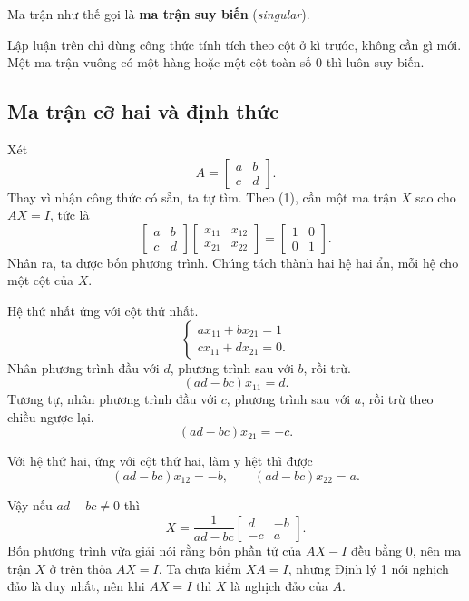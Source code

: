 \documentclass[12pt,a4paper]{article}
\begin{document}
Ma trận như thế gọi là \textbf{ma trận suy biến} (\emph{singular}).

Lập luận trên chỉ dùng công thức tính tích theo cột ở kì trước, không cần gì mới. Một ma trận vuông có một hàng hoặc một cột toàn số \(0\) thì luôn suy biến.

\subsection{Ma trận cỡ hai và định thức}

Xét
$$
A=\left[ \begin{array}{cc} a & b\\ c & d \end{array} \right].
$$
Thay vì nhận công thức có sẵn, ta tự tìm. Theo (1), cần một ma trận \(X\) sao cho \(AX=I\), tức là
$$
\left[ \begin{array}{cc} a & b\\ c & d \end{array} \right]\left[ \begin{array}{cc} x_{11} & x_{12}\\ x_{21} & x_{22} \end{array} \right]=\left[ \begin{array}{cc} 1 & 0\\ 0 & 1 \end{array} \right].
$$
Nhân ra, ta được bốn phương trình. Chúng tách thành hai hệ hai ẩn, mỗi hệ cho một cột của \(X\).

Hệ thứ nhất ứng với cột thứ nhất.
$$
\begin{cases} ax_{11}+bx_{21}=1\\ cx_{11}+dx_{21}=0. \end{cases}
$$
Nhân phương trình đầu với \(d\), phương trình sau với \(b\), rồi trừ.
$$
(ad-bc)x_{11}=d.
$$
Tương tự, nhân phương trình đầu với \(c\), phương trình sau với \(a\), rồi trừ theo chiều ngược lại.
$$
(ad-bc)x_{21}=-c.
$$

Với hệ thứ hai, ứng với cột thứ hai, làm y hệt thì được
$$
(ad-bc)x_{12}=-b,\qquad (ad-bc)x_{22}=a.
$$

Vậy nếu \(ad-bc\neq0\) thì
$$
X=\frac{1}{ad-bc}\left[ \begin{array}{rr} d & -b\\ -c & a \end{array} \right]. \tag{3}
$$
Bốn phương trình vừa giải nói rằng bốn phần tử của \(AX-I\) đều bằng \(0\), nên ma trận \(X\) ở trên thỏa \(AX=I\). Ta chưa kiểm \(XA=I\), nhưng Định lý 1 nói nghịch đảo là duy nhất, nên khi \(AX=I\) thì \(X\) là nghịch đảo của \(A\).
\end{document}
